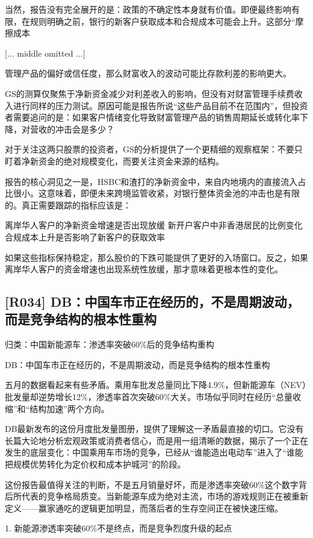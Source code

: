 \documentclass[11pt]{ctexart}
\begin{document}
当然，报告没有完全展开的是：政策的不确定性本身就有价值。即便最终影响有限，在规则明确之前，银行的新客户获取成本和合规成本可能会上升。这部分“摩擦成本

[... middle omitted ...]

管理产品的偏好或信任度，那么财富收入的波动可能比存款利差的影响更大。

GS的测算仅聚焦于净新资金减少对利差收入的影响，但没有对财富管理手续费收入进行同样的压力测试。原因可能是报告所说“这些产品目前不在范围内”，但投资者需要追问的是：如果客户情绪变化导致财富管理产品的销售周期延长或转化率下降，对营收的冲击会是多少？

对于关注这两只股票的投资者，GS的分析提供了一个更精细的观察框架：不要只盯着净新资金的绝对规模变化，而要关注资金来源的结构。

报告的核心洞见之一是，HSBC和渣打的净新资金中，来自内地境内的直接流入占比很小。这意味着，即便未来跨境监管收紧，对银行整体资金池的冲击也是有限的。真正需要跟踪的指标应该是：

离岸华人客户的净新资金增速是否出现放缓 新开户客户中非香港居民的比例变化 合规成本上升是否影响了新客户的获取效率

如果这些指标保持稳定，那么股价的下跌可能提供了更好的入场窗口。反之，如果离岸华人客户的资金增速也出现系统性放缓，那才意味着更根本性的变化。

\subsection{[R034] DB：中国车市正在经历的，不是周期波动，而是竞争结构的根本性重构}
{\small\color{refgray}归类：中国新能源车：渗透率突破60\%后的竞争结构重构}

DB：中国车市正在经历的，不是周期波动，而是竞争结构的根本性重构

五月的数据看起来有些矛盾。乘用车批发总量同比下降4.9\%，但新能源车（NEV）批发量却逆势增长12\%，渗透率首次突破60\%大关。市场似乎同时在经历“总量收缩”和“结构加速”两个方向。

DB最新发布的这份月度批发量图册，提供了理解这一矛盾最直接的切口。它没有长篇大论地分析宏观政策或消费者信心，而是用一组清晰的数据，揭示了一个正在发生的底层变化：中国乘用车市场的竞争，已经从“谁能造出电动车”进入了“谁能把规模优势转化为定价权和成本护城河”的阶段。

这份报告最值得关注的判断，不是五月销量好坏，而是渗透率突破60\%这个数字背后所代表的竞争格局质变。当新能源车成为绝对主流，市场的游戏规则正在被重新定义——赢家通吃的逻辑更加明显，而落后者的生存空间正在被快速压缩。

1. 新能源渗透率突破60\%不是终点，而是竞争烈度升级的起点
\end{document}
